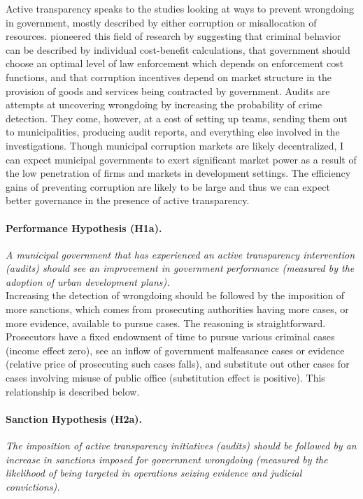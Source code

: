 \documentclass[11pt]{article}
\begin{document}
Active transparency speaks to the studies looking at ways to prevent wrongdoing in government, mostly described by either corruption or misallocation of resources. \citet{BeckerCrimePunishmentEconomic1968,BeckerLawEnforcementMalfeasance1974,Rose-AckermanEconomicsCorruption1975} pioneered this field of research by suggesting that criminal behavior can be described by individual cost-benefit calculations, that government should choose an optimal level of law enforcement which depends on enforcement cost functions, and that corruption incentives depend on market structure in the provision of goods and services being contracted by government. Audits are attempts at uncovering wrongdoing by increasing the probability of crime detection. They come, however, at a cost of setting up teams, sending them out to municipalities, producing audit reports, and everything else involved in the investigations. Though municipal corruption markets are likely decentralized, I can expect municipal governments to exert significant market power as a result of the low penetration of firms and markets in development settings. The efficiency gains of preventing corruption are likely to be large and thus we can expect better governance in the presence of active transparency.

\paragraph{Performance Hypothesis (H1a).} \emph{A municipal government that has experienced an active transparency intervention (audits) should see an improvement in government performance (measured by the adoption of urban development plans).}\\

Increasing the detection of wrongdoing should be followed by the imposition of more sanctions, which comes from prosecuting authorities having more cases, or more evidence, available to pursue cases. The reasoning is straightforward. Prosecutors have a fixed endowment of time to pursue various criminal cases (income effect zero), see an inflow of government malfeasance cases or evidence (relative price of prosecuting such cases falls), and substitute out other cases for cases involving misuse of public office (substitution effect is positive). This relationship is described below.

\paragraph{Sanction Hypothesis (H2a).} \emph{The imposition of active transparency initiatives (audits) should be followed by an increase in sanctions imposed for government wrongdoing (measured by the likelihood of being targeted in operations seizing evidence and judicial convictions).} \\
\end{document}
